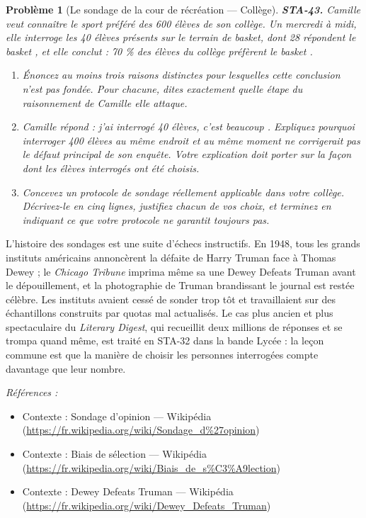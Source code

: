 \documentclass[11pt]{article}
\newtheorem{problem}{Problème}
\newenvironment{refs}{\par\small\noindent\emph{Références :}\begin{itemize}\setlength\itemsep{0pt}}{\end{itemize}\normalsize}
\begin{document}
\bigskip

\begin{problem}[{Le sondage de la cour de récréation --- Collège}]
\textbf{STA-43.} Camille veut connaître le sport préféré des 600 élèves de son collège. Un
mercredi à midi, elle interroge les 40 élèves présents sur le terrain de basket, dont 28 répondent
\og{} le basket \fg{}, et elle conclut : \og{} 70 \% des élèves du collège préfèrent le basket \fg{}.
\begin{enumerate}
\item[(a)] Énoncez au moins trois raisons distinctes pour lesquelles cette conclusion n'est pas fondée.
Pour chacune, dites exactement quelle étape du raisonnement de Camille elle attaque.
\item[(b)] Camille répond : \og{} j'ai interrogé 40 élèves, c'est beaucoup \fg{}. Expliquez pourquoi interroger
400 élèves au même endroit et au même moment ne corrigerait pas le défaut principal de son
enquête. Votre explication doit porter sur la façon dont les élèves interrogés ont été choisis.
\item[(c)] Concevez un protocole de sondage réellement applicable dans votre collège. Décrivez-le en cinq
lignes, justifiez chacun de vos choix, et terminez en indiquant ce que votre protocole ne garantit
toujours pas.
\end{enumerate}

\end{problem}

\noindent L'histoire des sondages est une suite d'échecs instructifs. En 1948, tous les
grands instituts américains annoncèrent la défaite de Harry Truman face à Thomas Dewey ; le
\textit{Chicago Tribune} imprima même sa une \og{} Dewey Defeats Truman \fg{} avant le dépouillement, et la
photographie de Truman brandissant le journal est restée célèbre. Les instituts avaient cessé de
sonder trop tôt et travaillaient sur des échantillons construits par quotas mal actualisés. Le cas
plus ancien et plus spectaculaire du \textit{Literary Digest}, qui recueillit deux millions de
réponses et se trompa quand même, est traité en STA-32 dans la bande Lycée : la leçon commune est
que la manière de choisir les personnes interrogées compte davantage que leur nombre.

\begin{refs}
\item Contexte : Sondage d'opinion --- Wikipédia (\url{https://fr.wikipedia.org/wiki/Sondage_d%27opinion})
\item Contexte : Biais de sélection --- Wikipédia (\url{https://fr.wikipedia.org/wiki/Biais_de_s%C3%A9lection})
\item Contexte : Dewey Defeats Truman --- Wikipédia (\url{https://fr.wikipedia.org/wiki/Dewey_Defeats_Truman})
\end{refs}
\end{document}
